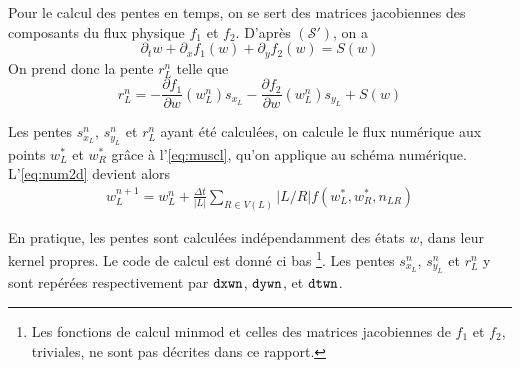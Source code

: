 \documentclass[
	french,
	11pt, %
]{fphw}
\begin{document}
Pour le calcul des pentes en temps, on se sert des matrices jacobiennes des composants du flux physique $f_1$ et $f_2$. D'après $(\mathcal{S}')$, on a
$$
\partial_t w + \partial_x f_1(w) + \partial_y f_2(w) = S(w)
$$
On prend donc la pente $r^n_L$ telle que 
$$
r^n_L = - \frac{\partial f_1}{\partial w} (w^n_L) s_{x_L} - \frac{\partial f_2}{\partial w} (w^n_L) s_{y_L} + S(w) 
$$ 


Les pentes $s^n_{x_L}$, $s^n_{y_L}$ et  $r^n_L$ ayant été calculées, on calcule le flux numérique aux points $w^*_L$ et $w^*_R$ grâce à l'\cref{eq:muscl}, qu'on applique au schéma numérique. L'\cref{eq:num2d} devient alors
\begin{align}
	w^{n+1}_L = w^n_L + \frac{\Delta t}{\vert L \vert } \sum_{R\in V(L)} \vert L/R \vert f(w^*_L, w^*_R, n_{LR})
\end{align}

En pratique, les pentes sont calculées indépendamment des états $w$, dans leur kernel propres. 
Le code de calcul est donné ci bas \footnote{Les fonctions de calcul $\text{minmod}$ et celles des matrices jacobiennes de $f_1$ et $f_2$, triviales, ne sont pas décrites dans ce rapport.}. Les pentes $s^n_{x_L}$, $s^n_{y_L}$ et $r^n_L$ y sont repérées respectivement par $\verb|dxwn|$, $\verb|dywn|$, et $\verb|dtwn|$.
\end{document}
